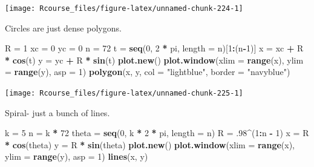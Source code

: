 \documentclass[]{book}
\newenvironment{Shaded}{\begin{snugshade}}{\end{snugshade}}
\newcommand{\KeywordTok}[1]{\textcolor[rgb]{0.13,0.29,0.53}{\textbf{#1}}}
\newcommand{\DataTypeTok}[1]{\textcolor[rgb]{0.13,0.29,0.53}{#1}}
\newcommand{\DecValTok}[1]{\textcolor[rgb]{0.00,0.00,0.81}{#1}}
\newcommand{\StringTok}[1]{\textcolor[rgb]{0.31,0.60,0.02}{#1}}
\newcommand{\OperatorTok}[1]{\textcolor[rgb]{0.81,0.36,0.00}{\textbf{#1}}}
\newcommand{\NormalTok}[1]{#1}
\theoremstyle{definition}
\theoremstyle{definition}
\theoremstyle{definition}
\theoremstyle{remark}
\begin{document}
\texttt{[image: Rcourse\_files/figure-latex/unnamed-chunk-224-1]}

Circles are just dense polygons.

\begin{Shaded}
\begin{Highlighting}[]
\NormalTok{R =}\StringTok{ }\DecValTok{1}
\NormalTok{xc =}\StringTok{ }\DecValTok{0}
\NormalTok{yc =}\StringTok{ }\DecValTok{0}
\NormalTok{n =}\StringTok{ }\DecValTok{72}
\NormalTok{t =}\StringTok{ }\KeywordTok{seq}\NormalTok{(}\DecValTok{0}\NormalTok{, }\DecValTok{2} \OperatorTok{*}\StringTok{ }\NormalTok{pi, }\DataTypeTok{length =}\NormalTok{ n)[}\DecValTok{1}\OperatorTok{:}\NormalTok{(n}\OperatorTok{-}\DecValTok{1}\NormalTok{)]}
\NormalTok{x =}\StringTok{ }\NormalTok{xc }\OperatorTok{+}\StringTok{ }\NormalTok{R }\OperatorTok{*}\StringTok{ }\KeywordTok{cos}\NormalTok{(t)}
\NormalTok{y =}\StringTok{ }\NormalTok{yc }\OperatorTok{+}\StringTok{ }\NormalTok{R }\OperatorTok{*}\StringTok{ }\KeywordTok{sin}\NormalTok{(t)}
\KeywordTok{plot.new}\NormalTok{()}
\KeywordTok{plot.window}\NormalTok{(}\DataTypeTok{xlim =} \KeywordTok{range}\NormalTok{(x), }\DataTypeTok{ylim =} \KeywordTok{range}\NormalTok{(y), }\DataTypeTok{asp =} \DecValTok{1}\NormalTok{)}
\KeywordTok{polygon}\NormalTok{(x, y, }\DataTypeTok{col =} \StringTok{"lightblue"}\NormalTok{, }\DataTypeTok{border =} \StringTok{"navyblue"}\NormalTok{)}
\end{Highlighting}
\end{Shaded}

\texttt{[image: Rcourse\_files/figure-latex/unnamed-chunk-225-1]}

Spiral- just a bunch of lines.

\begin{Shaded}
\begin{Highlighting}[]
\NormalTok{k =}\StringTok{ }\DecValTok{5}
\NormalTok{n =}\StringTok{ }\NormalTok{k }\OperatorTok{*}\StringTok{ }\DecValTok{72}
\NormalTok{theta =}\StringTok{ }\KeywordTok{seq}\NormalTok{(}\DecValTok{0}\NormalTok{, k }\OperatorTok{*}\StringTok{ }\DecValTok{2} \OperatorTok{*}\StringTok{ }\NormalTok{pi, }\DataTypeTok{length =}\NormalTok{ n)}
\NormalTok{R =}\StringTok{ }\NormalTok{.}\DecValTok{98}\OperatorTok{^}\NormalTok{(}\DecValTok{1}\OperatorTok{:}\NormalTok{n }\OperatorTok{-}\StringTok{ }\DecValTok{1}\NormalTok{)}
\NormalTok{x =}\StringTok{ }\NormalTok{R }\OperatorTok{*}\StringTok{ }\KeywordTok{cos}\NormalTok{(theta)}
\NormalTok{y =}\StringTok{ }\NormalTok{R }\OperatorTok{*}\StringTok{ }\KeywordTok{sin}\NormalTok{(theta)}
\KeywordTok{plot.new}\NormalTok{()}
\KeywordTok{plot.window}\NormalTok{(}\DataTypeTok{xlim =} \KeywordTok{range}\NormalTok{(x), }\DataTypeTok{ylim =} \KeywordTok{range}\NormalTok{(y), }\DataTypeTok{asp =} \DecValTok{1}\NormalTok{)}
\KeywordTok{lines}\NormalTok{(x, y)}
\end{Highlighting}
\end{Shaded}
\end{document}
